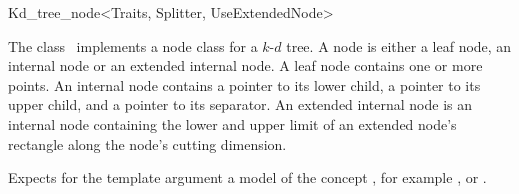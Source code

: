 

\begin{ccRefClass}{Kd_tree_node<Traits, Splitter, UseExtendedNode>}  %


\begin{ccAdvanced}

\ccDefinition
  
The class \ccRefName\ implements a node class for a $k$-$d$ tree. 
A node is either a leaf node, an internal node or an extended internal node.
A leaf node contains one or more points. An internal node contains a pointer
to its lower child, a pointer to its upper child, and a pointer to its separator.
An extended internal node is an internal node containing the lower and 
upper limit of an extended node's rectangle
along the node's cutting dimension.



Expects for the template argument a model of the concept ,
for example , or .

\ccTypes




\ccCreation
{}  %



\ccOperations


\end{ccAdvanced}
\end{ccRefClass}
